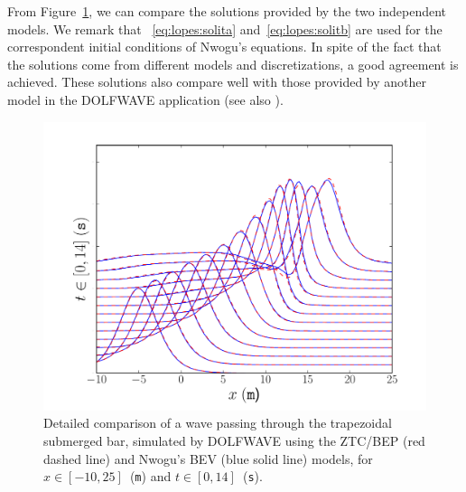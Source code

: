 From Figure~\ref{fig:lopes:zhaonwogu}, we can compare the solutions
provided by the two independent models.  We remark that
~\eqref{eq:lopes:solita} and~\eqref{eq:lopes:solitb} are used for the
correspondent initial conditions of Nwogu's equations.  In spite of
the fact that the solutions come from different models and
discretizations, a good agreement is achieved.  These solutions also
compare well with those provided by another model in the DOLFWAVE
application (see also ).

\begin{figure}
  \centering
  \includegraphics[width=\largefig]{chapters/lopes/pdf/ZhaoNwogu.pdf}
  \caption{Detailed comparison of a wave passing through the
    trapezoidal submerged bar, simulated by DOLFWAVE using the ZTC/BEP
    (red dashed line) and Nwogu's BEV (blue solid line) models, for
    $x\in[-10,25]$~({\tt m}) and $t\in[0,14]$~({\tt s}).}
  \label{fig:lopes:zhaonwogu}
\end{figure}

